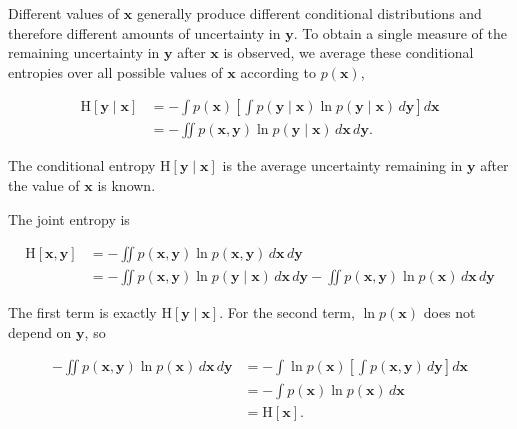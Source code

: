 \documentclass[10pt,twocolumn]{memoir}
\begin{document}
Different values of $\mathbf{x}$ generally produce different conditional distributions and therefore different amounts of uncertainty in $\mathbf{y}$. To obtain a single measure of the remaining uncertainty in $\mathbf{y}$ after $\mathbf{x}$ is observed, we average these conditional entropies over all possible values of $\mathbf{x}$ according to $p(\mathbf{x})$,

\begin{equation}
\begin{aligned}
    \mathrm{H}[\mathbf{y}\mid\mathbf{x}]
    &= -\int p(\mathbf{x})\left[\int p(\mathbf{y}\mid\mathbf{x})\ln p(\mathbf{y}\mid\mathbf{x})\,d\mathbf{y}\right]d\mathbf{x} \\
    &= -\iint p(\mathbf{x},\mathbf{y})\ln p(\mathbf{y}\mid\mathbf{x})\,d\mathbf{x}\,d\mathbf{y}.
\end{aligned}
\end{equation}

The conditional entropy $\mathrm{H}[\mathbf{y}\mid\mathbf{x}]$ is the average uncertainty remaining in $\mathbf{y}$ after the value of $\mathbf{x}$ is known.

The joint entropy is

\begin{equation}
\begin{aligned}
    \mathrm{H}[\mathbf{x},\mathbf{y}] &= -\iint p(\mathbf{x},\mathbf{y})\ln p(\mathbf{x},\mathbf{y})\,d\mathbf{x}\,d\mathbf{y} \\
    &= -\iint p(\mathbf{x},\mathbf{y})\ln p(\mathbf{y}\mid\mathbf{x})\,d\mathbf{x}\,d\mathbf{y} - \iint p(\mathbf{x},\mathbf{y}) \ln p(\mathbf{x})\,d\mathbf{x}\,d\mathbf{y}
\end{aligned}
\end{equation}

The first term is exactly $\mathrm{H}[\mathbf{y}\mid\mathbf{x}]$. For the second term, $\ln p(\mathbf{x})$ does not depend on $\mathbf{y}$, so

\begin{equation}
\begin{aligned}
    -\iint p(\mathbf{x},\mathbf{y})\ln p(\mathbf{x})\,d\mathbf{x}\,d\mathbf{y}
    &=-\int \ln p(\mathbf{x})\left[\int p(\mathbf{x},\mathbf{y})\,d\mathbf{y}\right]d\mathbf{x} \\
    &=-\int p(\mathbf{x})\ln p(\mathbf{x})\,d\mathbf{x} \\
    &=\mathrm{H}[\mathbf{x}].
\end{aligned}
\end{equation}
\end{document}
